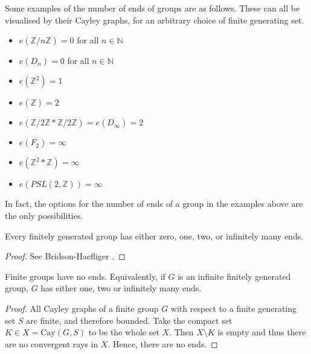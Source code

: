 \begin{example}
    Some examples of the number of ends of groups are as follows. These can all be visualised by their Cayley graphs, for an arbitrary choice of finite generating set.
    \begin{multicols}{2}
    \begin{itemize}
        \item \(e(\mathbb{Z}/n\mathbb{Z}) = 0\) for all \(n \in \mathbb{N}\)
        \item \(e(D_n) = 0\) for all \(n \in \mathbb{N}\)
        \item \(e(\mathbb{Z}^2) = 1\)
        \item \(e(\mathbb{Z}) = 2\)
    \end{itemize}
    
        \columnbreak
        
    \begin{itemize}
        \item \(e(\mathbb{Z}/2\mathbb{Z} * \mathbb{Z}/2\mathbb{Z}) = e(D_{\infty}) = 2\)
        \item \(e(F_2) = \infty\)
        \item \(e(\mathbb{Z}^2 * \mathbb{Z}) = \infty\)
        \item \(e(PSL(2,\mathbb{Z})) = \infty\)
    \end{itemize}
    \end{multicols}
\end{example}

In fact, the options for the number of ends of a group in the examples above are the only possibilities.

\begin{theorem}
\label{FH}
    Every finitely generated group has either zero, one, two, or infinitely many ends.
\end{theorem}

\begin{proof}
    See Bridson-Haefliger \cite[p.~146--147]{bridson_haefliger_metric_1999}.
\end{proof}

\begin{corollary}
    Finite groups have no ends. Equivalently, if \(G\) is an infinite finitely generated group, \(G\) has either one, two or infinitely many ends.
\end{corollary}

\begin{proof} %
    All Cayley graphs of a finite group \(G\) with respect to a finite generating set \(S\) are finite, and therefore bounded. Take the compact set \(K \in X = \mathrm{Cay}(G,S)\) to be the whole set \(X\). Then \(X \setminus K\) is empty and thus there are no convergent rays in \(X\). Hence, there are no ends.
\end{proof}

